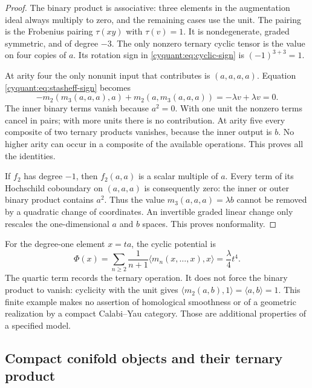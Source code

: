 \begin{proof}
The binary product is associative: three elements in the augmentation
ideal always multiply to zero, and the remaining cases use the unit.
The pairing is the Frobenius pairing $\tau(xy)$ with $\tau(v)=1$.
It is nondegenerate, graded symmetric, and of degree $-3$.
The only nonzero ternary cyclic tensor is the value on four copies of
$a$.  Its rotation sign in \eqref{cyquant:eq:cyclic-sign} is
$(-1)^{3+3}=1$.

At arity four the only nonunit input that contributes is $(a,a,a,a)$.
Equation \eqref{cyquant:eq:stasheff-sign} becomes
\[
 -m_2(m_3(a,a,a),a)+m_2(a,m_3(a,a,a))
       =-\lambda v+\lambda v=0.
\]
The inner binary terms vanish because $a^2=0$.  With one unit the
nonzero terms cancel in pairs; with more units there is no contribution.
At arity five every composite of two ternary products vanishes, because
the inner output is $b$.  No higher arity can occur in a composite of
the available operations.  This proves all the identities.

If $f_2$ has degree $-1$, then $f_2(a,a)$ is a scalar multiple of $a$.
Every term of its Hochschild coboundary on $(a,a,a)$ is consequently
zero: the inner or outer binary product contains $a^2$.  Thus the value
$m_3(a,a,a)=\lambda b$ cannot be removed by a quadratic change of
coordinates.  An invertible graded linear change only rescales the
one-dimensional $a$ and $b$ spaces.  This proves nonformality.
\end{proof}

For the degree-one element $x=ta$, the cyclic potential is
\[
 \Phi(x)=\sum_{n\geq2}\frac1{n+1}
              \langle m_n(x,\ldots,x),x\rangle
         =\frac\lambda4t^4.
\]
The quartic term records the ternary operation.  It does not force the
binary product to vanish: cyclicity with the unit gives
$\langle m_2(a,b),1\rangle=\langle a,b\rangle=1$.
This finite example makes no assertion of homological smoothness or of
a geometric realization by a compact Calabi--Yau category.  Those are
additional properties of a specified model.

\subsection{Compact conifold objects and their ternary product}

